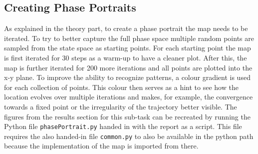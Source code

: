 \subsection{Creating Phase Portraits}
As explained in the theory part, to create a phase portrait the map needs to be iterated.
To try to better capture the full phase space multiple random points are sampled from the state space as starting points.
For each starting point the map is first iterated for 30 steps as a warm-up to have a cleaner plot.
After this, the map is further iterated for 200 more iterations and all points are plotted into the x-y plane.
To improve the ability to recognize patterns, a colour gradient is used for each collection of points.
This colour then serves as a hint to see how the location evolves over multiple iterations and makes, for example, the convergence towards a fixed point or the irregularity of the trajectory better visible.
The figures from the results section for this sub-task can be recreated by running the Python file \texttt{phasePortrait.py} handed in with the report as a script.
This file requires the also handed-in file \texttt{common.py} to also be available in the python path because the implementation of the map is imported from there.